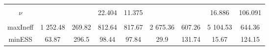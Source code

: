 \begin{footnotesize}
\begin{singlespace}
\begin{tabular}{ccccccccc}
 & \begin{tiny} [-0.032,0.164] \end{tiny}  & \begin{tiny} [-0.006,0.126] \end{tiny}  & \begin{tiny} [-0.031,0.166] \end{tiny}  & \begin{tiny} [-0.039,0.136] \end{tiny}  & \begin{tiny} [-0.545,-0.367] \end{tiny}  & \begin{tiny} [-0.475,-0.348] \end{tiny}  & \begin{tiny} [-0.541,-0.362] \end{tiny}  & \begin{tiny} [-0.462,-0.334] \end{tiny}  \\ 
$\nu$ &  &  & 22.404 & 11.375 &  &  & 16.886 &  106.091 \\ 
 &  &  & \begin{tiny} [16.6,27.8] \end{tiny}  & \begin{tiny} [9.2,13.7] \end{tiny}  &  &  & \begin{tiny} [12.4,22.4] \end{tiny}  & \begin{tiny} [73.9, 128] \end{tiny}  \\  \midrule 
maxIneff & 1 252.48 &  269.82 &  812.64 &  817.67 & 2 675.36 &  607.26 & 5 104.53 &  644.36 \\ 
minESS & 63.87 &  296.5 & 98.44 & 97.84 & 29.9 &  131.74 & 15.67 &  124.15 \\ \bottomrule 
\end{tabular}
\end{singlespace}
\end{footnotesize}
